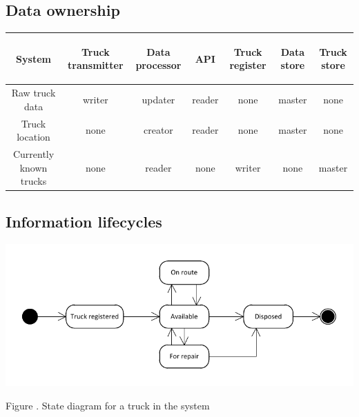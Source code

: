 \documentclass[a4paper,11pt]{report}
\newcommand{\mycaption}[1]{
  \addtocounter{figures}{1}
  Figure \arabic{figures}. #1
}
\begin{document}
\subsection{Data ownership}
\label{sec:data-ownership}

\begin{tabular}{|c|c|c|c|c|c|c|}
\begin{sideways}\textbf{System}\end{sideways} & \begin{sideways}\textbf{Truck transmitter}\end{sideways} & \begin{sideways}\textbf{Data processor}\end{sideways} & \begin{sideways}\textbf{API}\end{sideways} & \begin{sideways}\textbf{Truck register}\end{sideways} & \begin{sideways}\textbf{Data store}\end{sideways} & \begin{sideways}\textbf{Truck store}\end{sideways} \\\hline
Raw truck data & writer & updater & reader & none & master & none \\\hline
Truck location & none & creator & reader & none & master & none \\\hline
Currently known trucks & none & reader & none & writer & none & master \\\hline
\end{tabular}

\subsection{Information lifecycles}
\label{sec:inform-lifecycl}

\begin{center}
  \includegraphics[width=\textwidth]{figures/Information_lifecycle}\\
  \mycaption{State diagram for a truck in the system}
\end{center}
\end{document}
